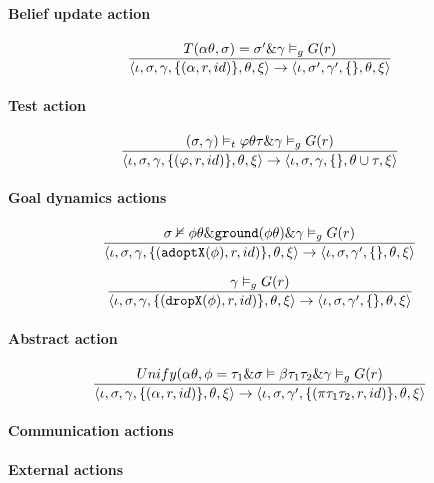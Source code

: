 \documentclass[a4paper]{article}
\begin{document}
\paragraph{Belief update action}
$$ {{T(\alpha \theta, \sigma) = \sigma' \& \gamma \vDash_{g} G(r)} \over {\langle \iota, \sigma, \gamma, \{(\alpha, r, id)\}, \theta, \xi \rangle  \rightarrow \langle \iota, \sigma', \gamma', \{\}, \theta, \xi \rangle}} $$
  
\paragraph{Test action}
$$ {{( \sigma, \gamma) \vDash_{t} \varphi \theta \tau \& \gamma \vDash_{g} G(r)}\over{\langle \iota, \sigma, \gamma, \{(\varphi, r, id)\}, \theta, \xi \rangle  \rightarrow \langle \iota, \sigma, \gamma, \{\}, \theta \cup \tau, \xi \rangle}} $$


\paragraph{Goal dynamics actions}
$$ {{{\sigma \nvDash \phi \theta} \& {\texttt{ground}(\phi \theta)} \& {\gamma \vDash_{g} G(r)}}\over{\langle \iota, \sigma, \gamma, \{(\texttt{adoptX}(\phi), r, id)\}, \theta, \xi \rangle  \rightarrow \langle \iota, \sigma, \gamma', \{\}, \theta, \xi \rangle}} $$

$$ {{\gamma \vDash_{g} G(r)} \over {\langle \iota, \sigma, \gamma, \{(\texttt{dropX}(\phi), r, id)\}, \theta, \xi \rangle  \rightarrow \langle \iota, \sigma, \gamma', \{\}, \theta, \xi \rangle}} $$


\paragraph{Abstract action}
$$ {{Unify(\alpha\theta, \phi = \tau_{1} \& \sigma \vDash \beta\tau_{1}\tau_{2} \& \gamma \vDash_{g} G(r) } \over {\langle \iota, \sigma, \gamma, \{(\alpha, r, id)\}, \theta, \xi \rangle  \rightarrow \langle \iota, \sigma, \gamma', \{(\pi\tau_{1}\tau_{2}, r, id)\}, \theta, \xi \rangle}} $$

\paragraph{Communication actions}

\paragraph{External actions}
\end{document}
